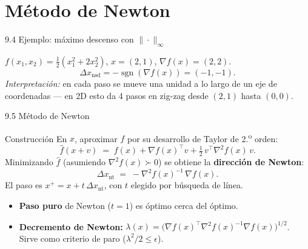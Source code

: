 \documentclass[10pt,aspectratio=169]{beamer}
\newcommand{\Hess}{\nabla^{2} f}
\begin{document}
\section{Método de Newton}
\begin{frame}{9.4 Ejemplo: máximo descenso con $\|\cdot\|_\infty$}
  \begin{example}
    $f(x_1,x_2) = \tfrac{1}{2}(x_1^2 + 2x_2^2)$, $x=(2,1)$, $\nabla f(x) = (2,2)$.
    \[
      \Delta x_{\mathrm{nsd}} = -\operatorname{sgn}(\nabla f(x)) = (-1,-1).
    \]
    \emph{Interpretación:} en cada paso se mueve una unidad a lo largo de
    un eje de coordenadas --- en 2D esto da 4 pasos en zig-zag desde $(2,1)$
    hasta $(0,0)$.
  \end{example}
  \begin{flushright}
  \end{flushright}
\end{frame}

\begin{frame}{9.5 Método de Newton}
  \begin{block}{Construcción}
    En $x$, aproximar $f$ por su desarrollo de Taylor de 2.\textsuperscript{o} orden:
    \[
      \hat f(x+v) \;=\; f(x) + \nabla f(x)^{\top} v + \tfrac{1}{2}\, v^{\top} \Hess(x)\, v.
    \]
    Minimizando $\hat f$ (asumiendo $\Hess(x) \succ 0$) se obtiene la
    \textbf{dirección de Newton}:
    \[
      \Delta x_{\mathrm{nt}} \;=\; -\Hess(x)^{-1}\, \nabla f(x).
    \]
    El paso es $x^{+} = x + t\, \Delta x_{\mathrm{nt}}$, con $t$ elegido por búsqueda de línea.
  \end{block}
  \begin{itemize}
    \item \textbf{Paso puro} de Newton ($t=1$) es óptimo cerca del óptimo.
    \item \textbf{Decremento de Newton:}
          $\lambda(x) = \bigl(\nabla f(x)^{\top} \Hess(x)^{-1} \nabla f(x)\bigr)^{1/2}$.
          Sirve como criterio de paro ($\lambda^{2}/2 \le \epsilon$).
  \end{itemize}
\end{frame}
\end{document}
